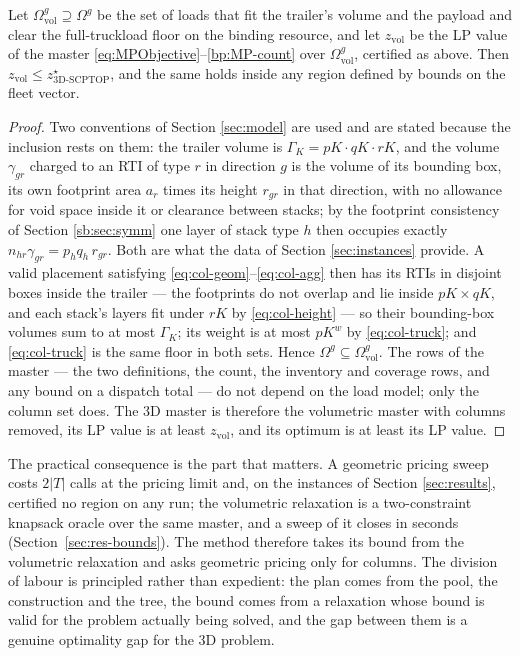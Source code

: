 \begin{proposition}
\label{prop:inclusion}
Let $\Omega^{g}_{\mathrm{vol}}\supseteq\Omega^{g}$ be the set of loads
that fit the trailer's volume and the payload and clear the
full-truckload floor on the binding resource, and let
$z_{\mathrm{vol}}$ be the LP value of the master
\eqref{eq:MPObjective}--\eqref{bp:MP-count} over
$\Omega^{g}_{\mathrm{vol}}$, certified as above. Then
$z_{\mathrm{vol}}\le z^{\star}_{\text{3D-SCPTOP}}$, and the same holds
inside any region defined by bounds on the fleet vector.
\end{proposition}
\begin{proof}
Two conventions of Section \ref{sec:model} are used and are stated
because the inclusion rests on them: the trailer volume is
$\Gamma_{K}=pK\cdot qK\cdot rK$, and the volume $\gamma_{gr}$ charged to
an RTI of type $r$ in direction $g$ is the volume of its bounding box,
its own footprint area $a_{r}$ times its height $r_{gr}$ in that
direction, with no allowance for void space inside it or clearance
between stacks; by the footprint consistency of Section
\ref{sb:sec:symm} one layer of stack type $h$ then occupies exactly
$n_{hr}\gamma_{gr}=p_{h}q_{h}\,r_{gr}$. Both are what the data of
Section \ref{sec:instances} provide. A valid placement satisfying
\eqref{eq:col-geom}--\eqref{eq:col-agg} then has its RTIs in disjoint
boxes inside the trailer --- the footprints do not overlap and lie
inside $pK\times qK$, and each stack's layers fit under $rK$ by
\eqref{eq:col-height} --- so their bounding-box volumes sum to at most
$\Gamma_{K}$; its weight is at most $pK^{w}$ by
\eqref{eq:col-truck}; and \eqref{eq:col-truck} is the same floor in
both sets. Hence
$\Omega^{g}\subseteq\Omega^{g}_{\mathrm{vol}}$. The rows of the master
--- the two definitions, the count, the inventory and coverage rows, and
any bound on a dispatch total --- do not depend on the load model; only
the column set does. The 3D master is therefore the volumetric master
with columns removed, its LP value is at least $z_{\mathrm{vol}}$, and
its optimum is at least its LP value.
\end{proof}

The practical consequence is the part that matters. A geometric pricing
sweep costs $2|T|$ calls at the pricing limit and, on the instances of
Section \ref{sec:results}, certified no region on any run; the
volumetric relaxation is a two-constraint knapsack oracle over the same
master, and a sweep of it closes in seconds
(Section~\ref{sec:res-bounds}). The method therefore takes its bound from the volumetric
relaxation and asks geometric pricing only for columns. The division of
labour is principled rather than expedient: the plan comes from the
pool, the construction and the tree, the bound comes from a relaxation
whose bound is valid for the problem actually being solved, and the gap
between them is a genuine optimality gap for the 3D problem.

